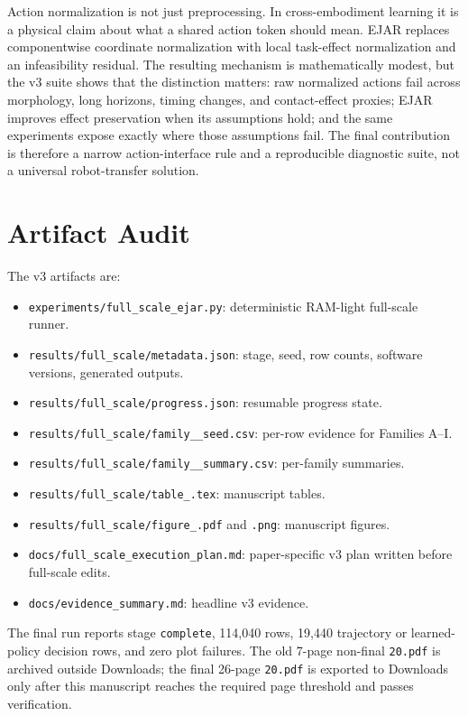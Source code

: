 \documentclass{article}
\begin{document}
Action normalization is not just preprocessing. In cross-embodiment learning it is a physical claim about what a shared action token should mean. EJAR replaces componentwise coordinate normalization with local task-effect normalization and an infeasibility residual. The resulting mechanism is mathematically modest, but the v3 suite shows that the distinction matters: raw normalized actions fail across morphology, long horizons, timing changes, and contact-effect proxies; EJAR improves effect preservation when its assumptions hold; and the same experiments expose exactly where those assumptions fail. The final contribution is therefore a narrow action-interface rule and a reproducible diagnostic suite, not a universal robot-transfer solution.




\appendix

\clearpage
\section{Artifact Audit}

The v3 artifacts are:
\begin{itemize}
\item \texttt{experiments/full\_scale\_ejar.py}: deterministic RAM-light full-scale runner.
\item \texttt{results/full\_scale/metadata.json}: stage, seed, row counts, software versions, generated outputs.
\item \texttt{results/full\_scale/progress.json}: resumable progress state.
\item \texttt{results/full\_scale/family\_\textasteriskcentered\_seed.csv}: per-row evidence for Families A--I.
\item \texttt{results/full\_scale/family\_\textasteriskcentered\_summary.csv}: per-family summaries.
\item \texttt{results/full\_scale/table\_\textasteriskcentered.tex}: manuscript tables.
\item \texttt{results/full\_scale/figure\_\textasteriskcentered.pdf} and \texttt{.png}: manuscript figures.
\item \texttt{docs/full\_scale\_execution\_plan.md}: paper-specific v3 plan written before full-scale edits.
\item \texttt{docs/evidence\_summary.md}: headline v3 evidence.
\end{itemize}

The final run reports stage \texttt{complete}, 114,040 rows, 19,440 trajectory or learned-policy decision rows, and zero plot failures. The old 7-page non-final \texttt{20.pdf} is archived outside Downloads; the final 26-page \texttt{20.pdf} is exported to Downloads only after this manuscript reaches the required page threshold and passes verification.
\end{document}
